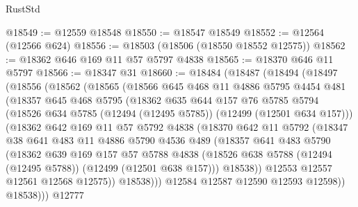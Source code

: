 \begin{lexlean}{RustStd}
\begin{coremodule}
@18549 := @12559 @18548
@18550 := @18547 @18549
@18552 := @12564 (@12566 @624)
@18556 := @18503 (@18506 (@18550 @18552 @12575))
@18562 := @18362 @646 @169 @11 @57 @5797 @4838
@18565 := @18370 @646 @11 @5797
@18566 := @18347 @31
@18660 := @18484
    (@18487
      (@18494
        (@18497
          (@18556
            (@18562
              (@18565
                (@18566
                  @645
                  @468
                  @11
                  @4886
                  @5795
                  @4454
                  @481
                  (@18357
                    @645
                    @468
                    @5795
                    (@18362
                      @635
                      @644
                      @157
                      @76
                      @5785
                      @5794
                      (@18526 @634 @5785 (@12494 (@12495 @5785)) (@12499 (@12501 @634 @157)))
                      (@18362
                        @642
                        @169
                        @11
                        @57
                        @5792
                        @4838
                        (@18370
                          @642
                          @11
                          @5792
                          (@18347
                            @38
                            @641
                            @483
                            @11
                            @4886
                            @5790
                            @4536
                            @489
                            (@18357
                              @641
                              @483
                              @5790
                              (@18362
                                @639
                                @169
                                @157
                                @57
                                @5788
                                @4838
                                (@18526
                                  @638
                                  @5788
                                  (@12494 (@12495 @5788))
                                  (@12499 (@12501 @638 @157)))
                                @18538))
                            @12553
                            @12557
                            @12561
                            @12568
                            @12575))
                        @18538)))
                  @12584
                  @12587
                  @12590
                  @12593
                  @12598))
              @18538)))
        @12777

\end{coremodule}
\end{lexlean}
